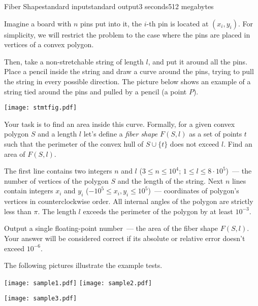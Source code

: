 \begin{problem}{Fiber Shape}{standard input}{standard output}{3 seconds}{512 megabytes}

Imagine a board with $n$ pins put into it, the $i$-th pin is located at $(x_i, y_i)$. 
For simplicity, we will restrict the problem to the case where the pins are placed in vertices of a convex polygon.

Then, take a non-stretchable string of length $l$, and put it around all the pins. Place a pencil inside the string and draw a curve around the pins, trying to pull the string in every possible direction. The picture below shows an example of a string tied around the pins and pulled by a pencil (a point $P$).

\begin{center}
\texttt{[image: stmtfig.pdf]}
\end{center}

Your task is to find an area inside this curve. Formally, for a given convex polygon $S$ and a length $l$ let's define a \emph{fiber shape} $F(S, l)$ as a set of points $t$ such that the perimeter of the convex hull of $S \cup \{t\}$ does not exceed $l$. Find an area of $F(S, l)$.

\InputFile
The first line contains two integers $n$ and $l$ ($3 \le n \le 10^4$; $1 \le l \le 8 \cdot 10^5$)~--- the number of vertices of the polygon $S$ and the length of the string. Next $n$ lines contain integers $x_i$ and $y_i$ ($-10^5 \le x_i, y_i \le 10^5$)~--- coordinates of polygon's vertices in counterclockwise order. All internal angles of the polygon are strictly less than $\pi$. The length $l$ exceeds the perimeter of the polygon by at least $10^{-3}$.

\OutputFile
Output a single floating-point number~--- the area of the fiber shape $F(S, l)$. Your answer will be considered correct if its absolute or relative error doesn't exceed $10^{-6}$. 

\Examples

\begin{example}
%
%
%
\end{example}

\Note
The following pictures illustrate the example tests.

\texttt{[image: sample1.pdf]}
\texttt{[image: sample2.pdf]}


\begin{center}
\texttt{[image: sample3.pdf]}
\end{center}

\end{problem}

